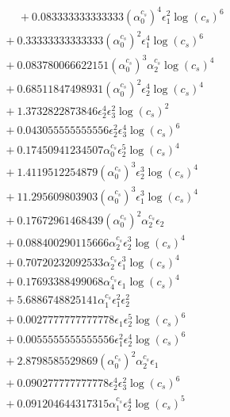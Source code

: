 \documentclass[10pt]{article}
\begin{document}
\begin{align*}
\phantom{F_{s,6}} &\phantom{={}}{}  + 0.083333333333333 \left(\alpha_{0}^{c_s}\right)^{4} \epsilon_{1}^{2} \log{\left(c_{s} \right)}^{6} \\
&{}  + 0.33333333333333 \left(\alpha_{0}^{c_s}\right)^{2} \epsilon_{1}^{4} \log{\left(c_{s} \right)}^{6} \\
&{}  + 0.083780066622151 \left(\alpha_{0}^{c_s}\right)^{3} \alpha_{2}^{c_s} \log{\left(c_{s} \right)}^{4} \\
&{}  + 0.68511847498931 \left(\alpha_{0}^{c_s}\right)^{2} \epsilon_{2}^{4} \log{\left(c_{s} \right)}^{4} \\
&{}  + 1.3732822873846 \epsilon_{2}^{4} \epsilon_{3}^{2} \log{\left(c_{s} \right)}^{2} \\
&{}  + 0.043055555555556 \epsilon_{2}^{2} \epsilon_{3}^{4} \log{\left(c_{s} \right)}^{6} \\
&{}  + 0.17450941234507 \alpha_{0}^{c_s} \epsilon_{2}^{5} \log{\left(c_{s} \right)}^{4} \\
&{}  + 1.4119512254879 \left(\alpha_{0}^{c_s}\right)^{3} \epsilon_{2}^{3} \log{\left(c_{s} \right)}^{4} \\
&{}  + 11.295609803903 \left(\alpha_{0}^{c_s}\right)^{3} \epsilon_{1}^{3} \log{\left(c_{s} \right)}^{4} \\
&{}  + 0.17672961468439 \left(\alpha_{0}^{c_s}\right)^{2} \alpha_{2}^{c_s} \epsilon_{2} \\
&{}  + 0.088400290115666 \alpha_{2}^{c_s} \epsilon_{2}^{3} \log{\left(c_{s} \right)}^{4} \\
&{}  + 0.70720232092533 \alpha_{2}^{c_s} \epsilon_{1}^{3} \log{\left(c_{s} \right)}^{4} \\
&{}  + 0.17693388499068 \alpha_{4}^{c_s} \epsilon_{1} \log{\left(c_{s} \right)}^{4} \\
&{}  + 5.6886748825141 \alpha_{1}^{c_s} \epsilon_{1}^{2} \epsilon_{2}^{2} \\
&{}  + 0.0027777777777778 \epsilon_{1} \epsilon_{2}^{5} \log{\left(c_{s} \right)}^{6} \\
&{}  + 0.0055555555555556 \epsilon_{1}^{2} \epsilon_{2}^{4} \log{\left(c_{s} \right)}^{6} \\
&{}  + 2.8798585529869 \left(\alpha_{0}^{c_s}\right)^{2} \alpha_{2}^{c_s} \epsilon_{1} \\
&{}  + 0.090277777777778 \epsilon_{2}^{4} \epsilon_{3}^{2} \log{\left(c_{s} \right)}^{6} \\
&{}  + 0.091204644317315 \alpha_{1}^{c_s} \epsilon_{2}^{4} \log{\left(c_{s} \right)}^{5} \\

\end{align*}
\end{document}
